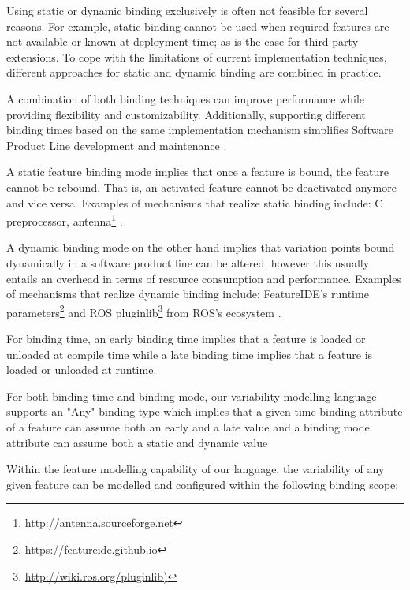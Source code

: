\documentclass[conference]{IEEEtran}
\newcommand{\foot}[1]{\footnote{\url{#1}}}
\begin{document}
Using static or dynamic binding exclusively is often not feasible for several reasons. For example, static binding cannot be used when required features are not available or known at deployment time; as is the case for third-party extensions. To cope with the limitations of current implementation techniques, different approaches for static and dynamic binding are combined in practice.

A combination of both binding techniques can improve performance while providing flexibility and customizability. Additionally, supporting different binding times based on the same implementation mechanism simplifies Software Product Line development and maintenance \cite{flex-feat-bind}.

A static feature binding mode implies that once a feature is bound, the feature cannot be rebound. That is, an activated feature cannot be deactivated anymore and vice versa. Examples of mechanisms that realize static binding include: C preprocessor, antenna\foot{http://antenna.sourceforge.net} \cite{flex-feat-bind}.

A dynamic binding mode on the other hand implies that variation points bound dynamically in a software product line can be altered, however this usually entails an overhead in terms of resource consumption and performance. Examples of mechanisms that realize dynamic binding include: FeatureIDE's runtime parameters\foot{https://featureide.github.io} and ROS pluginlib\foot{http://wiki.ros.org/pluginlib)} from ROS's ecosystem \cite{flex-feat-bind}.

For binding time, an early binding time implies that a feature is loaded or unloaded at compile time while a late binding time implies that a feature is loaded or unloaded at runtime.

For both binding time and binding mode, our variability modelling language supports an "Any" binding type which implies that a given time binding attribute of a feature can assume both an early and a late value and a binding mode attribute can assume both a static and dynamic value

Within the feature modelling capability of our language, the variability of any given feature can be modelled and configured within the following binding scope:
\end{document}
